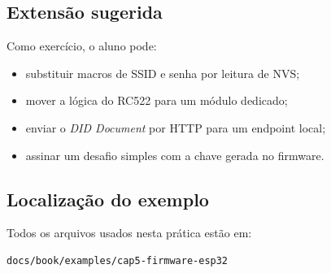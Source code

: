 \subsection{Extensão sugerida}
Como exercício, o aluno pode:
\begin{itemize}[leftmargin=*]
  \item substituir macros de SSID e senha por leitura de NVS;
  \item mover a lógica do RC522 para um módulo dedicado;
  \item enviar o \textit{DID Document} por HTTP para um endpoint local;
  \item assinar um desafio simples com a chave gerada no firmware.
\end{itemize}

\subsection{Localização do exemplo}
Todos os arquivos usados nesta prática estão em:
\begin{verbatim}
docs/book/examples/cap5-firmware-esp32
\end{verbatim}
